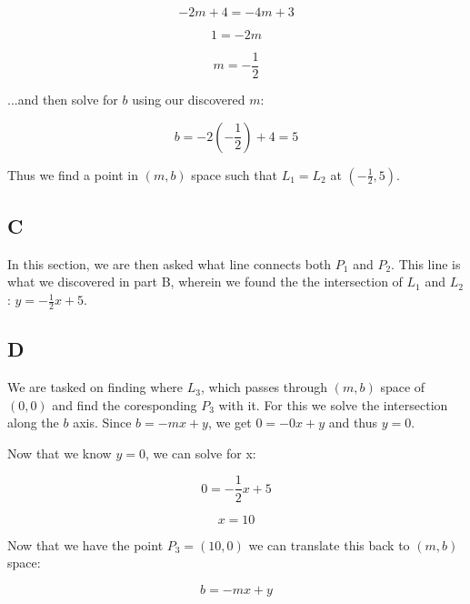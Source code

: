 \documentclass{article}
\begin{document}
\begin{equation}
    -2m + 4 = -4m + 3
\end{equation}

\begin{equation}
    1 = -2m
\end{equation}

\begin{equation}
    m = -\frac{1}{2}
\end{equation}

\noindent ...and then solve for $b$ using our discovered $m$:

\begin{equation}
    b = -2(-\frac{1}{2}) + 4 = 5
\end{equation}

\noindent Thus we find a point in $(m,b)$ space such that $L_1=L_2$ at $(-\frac{1}{2}, 5)$.

\subsection*{C}

In this section, we are then asked what line connects both $P_1$ and $P_2$. This line is what we discovered in part B, wherein we found the the intersection of $L_1$ and $L_2$: $y = -\frac{1}{2}x + 5$.

\subsection*{D}

We are tasked on finding where $L_3$, which passes through $(m,b)$ space of $(0,0)$ and find the coresponding $P_3$ with it. For this we solve the intersection along the $b$ axis. Since $b = -mx + y$, we get $0 = -0x + y$ and thus $y = 0$.

Now that we know $y=0$, we can solve for x:

\begin{equation}
    0 = -\frac{1}{2}x + 5
\end{equation}

\begin{equation}
    x = 10
\end{equation}

\noindent Now that we have the point $P_3=(10,0)$ we can translate this back to $(m,b)$ space:

\begin{equation}
    b = -mx + y
\end{equation}
\end{document}
